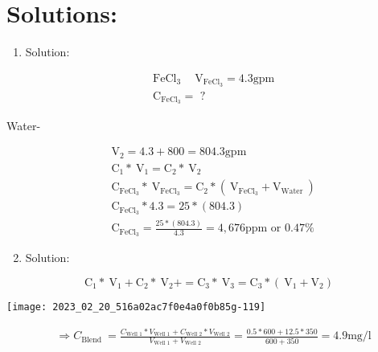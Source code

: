 \documentclass[10pt]{article}
\begin{document}
\begin{enumerate}
\begin{enumerate}
\begin{enumerate}
\end{enumerate}

\section{Solutions:}
\begin{enumerate}
  \item Solution:
\end{enumerate}

$$
\begin{aligned}
& \mathrm{FeCl}_{3} \quad \mathrm{~V}_{\mathrm{FeCl}_{3}}=4.3 \mathrm{gpm} \\
& \mathrm{C}_{\mathrm{FeCl}_{3}}=\text { ? }
\end{aligned}
$$

Water-

$$
\begin{aligned}
& \mathrm{V}_{2}=4.3+800=804.3 \mathrm{gpm} \\
& \mathrm{C}_{1} * \mathrm{~V}_{1}=\mathrm{C}_{2} * \mathrm{~V}_{2} \\
& \mathrm{C}_{\mathrm{FeCl}_{3}} * \mathrm{~V}_{\mathrm{FeCl}_{3}}=\mathrm{C}_{2} *\left(\mathrm{~V}_{\mathrm{FeCl}_{3}}+\mathrm{V}_{\text {Water }}\right) \\
& \mathrm{C}_{\mathrm{FeCl}_{3}} * 4.3=25 *(804.3) \\
& \mathrm{C}_{\mathrm{FeCl}_{3}}=\frac{25 *(804.3)}{4.3}=4,676 \mathrm{ppm} \text { or } 0.47 \%
\end{aligned}
$$

\begin{enumerate}
  \setcounter{enumi}{1}
  \item Solution:
\end{enumerate}

$$
\mathrm{C}_{1} * \mathrm{~V}_{1}+\mathrm{C}_{2} * \mathrm{~V}_{2}+=\mathrm{C}_{3} * \mathrm{~V}_{3}=\mathrm{C}_{3} *\left(\mathrm{~V}_{1}+\mathrm{V}_{2}\right)
$$

\begin{center}
\texttt{[image: 2023\_02\_20\_516a02ac7f0e4a0f0b85g-119]}
\end{center}

$$
\begin{aligned}
& \Longrightarrow C_{\text {Blend }}=\frac{C_{\text {Well } 1} * V_{\text {Well } 1}+C_{\text {Well } 2} * V_{\text {Well } 2}}{V_{\text {Well } 1}+V_{\text {Well } 2}}=\frac{0.5 * 600+12.5 * 350}{600+350}=4.9 \mathrm{mg} / \mathrm{l}
\end{aligned}
$$


\end{enumerate}
\end{enumerate}
\end{document}
